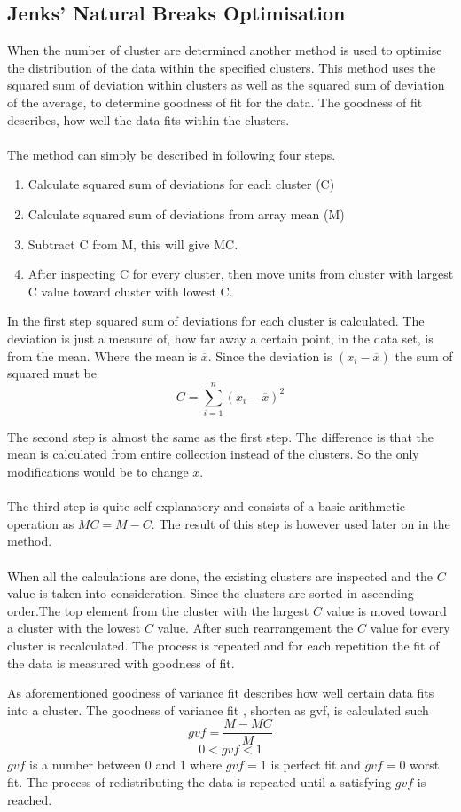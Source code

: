 \subsection{Jenks' Natural Breaks Optimisation}
\label{sub:jenks} 
When the number of cluster are determined another method is used to optimise the distribution of the data within the specified clusters. This method uses the squared sum of deviation within clusters as well as the squared sum of deviation of the average, to determine goodness of fit for the data. The goodness of fit describes, how well the data fits within the clusters.
\\\\
The method can simply be described in following four steps.
\begin{enumerate}
  \item Calculate squared sum of deviations for each cluster (C)
  \item Calculate squared sum of deviations from array mean (M)
  \item Subtract C from M, this will give MC.
  \item After inspecting C for every cluster, then move units from cluster with largest C value toward cluster with lowest C.
\end{enumerate}
In the first step squared sum of deviations for each cluster is calculated. The deviation is just a measure of, how far away a certain point, in the data set, is from the mean. Where the mean is $\overline{x}$. Since the deviation is $(x_i-\overline{x})$ the sum of squared must be $$C= \displaystyle\sum_{i=1}^{n}(x_i-\overline{x})^2$$

The second step is almost the same as the first step. The difference  is that the mean is calculated from entire collection instead of the clusters. So the only modifications would be to change $\overline{x}$.
\\\\
The third step is quite self-explanatory and consists of a basic arithmetic operation as $MC = M-C$. The result of this step is however used later on in the method.
\\\\
When all the calculations are done, the existing clusters are inspected and the $C$ value is taken into consideration. Since the clusters are sorted in ascending order.The top element from the cluster with the largest $C$ value is moved toward a cluster with the lowest $C$ value. After such rearrangement the $C$ value for every cluster is recalculated. The process is repeated and for each repetition the fit of the data is measured with goodness of fit.


As aforementioned goodness of variance fit describes how well certain data fits into a cluster. The goodness of variance fit , shorten as gvf, is calculated such $$gvf = \frac{M-MC}{M}$$
$$0<gvf<1$$
$gvf$ is a number between 0 and 1 where $gvf = 1$ is perfect fit and $gvf = 0$ worst fit.
The process of redistributing the data is repeated until a satisfying $gvf$ is reached.

